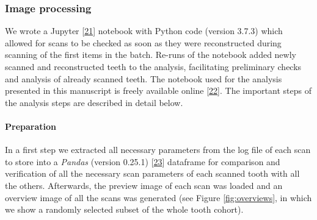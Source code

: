 \documentclass[
  american,
]{article}
\begin{document}
\hypertarget{image-processing}{%
\subsubsection{Image processing}\label{image-processing}}

We wrote a Jupyter {[}\protect\hyperlink{ref-pQ6Wbz73}{21}{]} notebook with Python code (version 3.7.3) which allowed for scans to be checked as soon as they were reconstructed during scanning of the first items in the batch.
Re-runs of the notebook added newly scanned and reconstructed teeth to the analysis, facilitating preliminary checks and analysis of already scanned teeth.
The notebook used for the analysis presented in this manuscript is freely available online {[}\protect\hyperlink{ref-tZRGGuMm}{22}{]}.
The important steps of the analysis steps are described in detail below.

\hypertarget{preparation}{%
\paragraph{Preparation}\label{preparation}}

In a first step we extracted all necessary parameters from the log file of each scan to store into a \emph{Pandas} (version 0.25.1) {[}\protect\hyperlink{ref-U5AcoDOX}{23}{]} dataframe for comparison and verification of all the necessary scan parameters of each scanned tooth with all the others.
Afterwards, the preview image of each scan was loaded and an overview image of all the scans was generated (see Figure \ref{fig:overviews}, in which we show a randomly selected subset of the whole tooth cohort).
\end{document}

